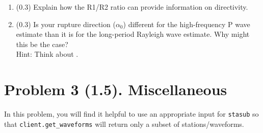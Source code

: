 \documentclass[11pt,titlepage,fleqn]{article}
\begin{document}
\begin{enumerate}
\begin{enumerate}
\item (0.3) Explain how the R1/R2 ratio can provide information on directivity.

\item (0.3) Is your rupture direction ($\alpha_0$) different for the high-frequency P wave estimate than it is for the long-period Rayleigh wave estimate. Why might this be the case? \\
Hint: Think about .
\end{enumerate}

\end{enumerate}


\section*{Problem 3 (1.5). Miscellaneous}

In this problem, you will find it helpful to use an appropriate input for \verb+stasub+ so that \verb+client.get_waveforms+ will return only a subset of stations/waveforms.
\end{document}

